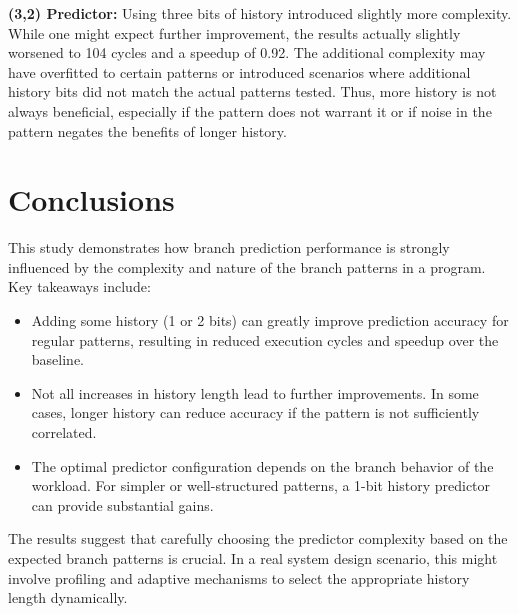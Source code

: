 \documentclass[12pt,letterpaper]{article}
\begin{document}
	\textbf{(3,2) Predictor:} Using three bits of history introduced slightly more complexity. While one might expect further improvement, the results actually slightly worsened to 104 cycles and a speedup of 0.92. The additional complexity may have overfitted to certain patterns or introduced scenarios where additional history bits did not match the actual patterns tested. Thus, more history is not always beneficial, especially if the pattern does not warrant it or if noise in the pattern negates the benefits of longer history.
	
	\section{Conclusions}
	This study demonstrates how branch prediction performance is strongly influenced by the complexity and nature of the branch patterns in a program. Key takeaways include:
	\begin{itemize}
		\item Adding some history (1 or 2 bits) can greatly improve prediction accuracy for regular patterns, resulting in reduced execution cycles and speedup over the baseline.
		\item Not all increases in history length lead to further improvements. In some cases, longer history can reduce accuracy if the pattern is not sufficiently correlated.
		\item The optimal predictor configuration depends on the branch behavior of the workload. For simpler or well-structured patterns, a 1-bit history predictor can provide substantial gains.
	\end{itemize}
	
	The results suggest that carefully choosing the predictor complexity based on the expected branch patterns is crucial. In a real system design scenario, this might involve profiling and adaptive mechanisms to select the appropriate history length dynamically.

	
\end{document}
